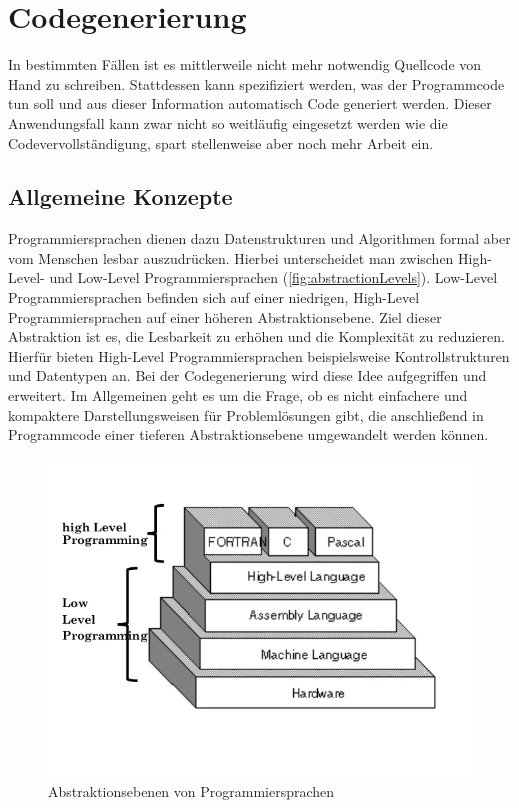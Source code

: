 \section{Codegenerierung}
\label{sec:codegeneration}
In bestimmten Fällen ist es mittlerweile nicht mehr notwendig Quellcode von Hand zu schreiben. Stattdessen kann spezifiziert werden, was der Programmcode tun soll und aus dieser Information automatisch Code generiert werden. Dieser Anwendungsfall kann zwar nicht so weitläufig eingesetzt werden wie die Codevervollständigung, spart stellenweise aber noch mehr Arbeit ein.

\subsection{Allgemeine Konzepte}
\label{subsec:generation_concepts}
Programmiersprachen dienen dazu Datenstrukturen und Algorithmen formal aber vom Menschen lesbar auszudrücken. Hierbei unterscheidet man zwischen High-Level- und Low-Level Programmiersprachen (\autoref{fig:abstractionLevels}). Low-Level Programmiersprachen befinden sich auf einer niedrigen, High-Level Programmiersprachen auf einer höheren Abstraktionsebene. Ziel dieser Abstraktion ist es, die Lesbarkeit zu erhöhen und die Komplexität zu reduzieren. Hierfür bieten High-Level Programmiersprachen beispielsweise Kontrollstrukturen und Datentypen an.
Bei der Codegenerierung wird diese Idee aufgegriffen und erweitert.
Im Allgemeinen geht es um die Frage, ob es nicht einfachere und kompaktere Darstellungsweisen für Problemlösungen gibt, die anschließend in Programmcode einer tieferen Abstraktionsebene umgewandelt werden können. 
\begin{figure}[!htb] 
	\centering
	\includegraphics[width=12cm]{images/abstractionlevel_programminglangs.png}
	\caption{Abstraktionsebenen von Programmiersprachen \cite{abstractionlevels_img}}
	\label{fig:abstractionLevels}
\end{figure}
\FloatBarrier

